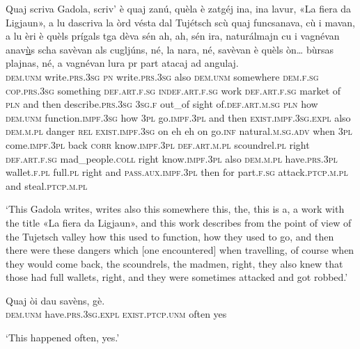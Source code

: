 \begin{linenumbers}
\gll Quaj scriva Gadola, scriv’ è quaj zanú, quèla è zatgéj ina, ina lavur, «La fiera da Ligjaun»\footnotemark, a lu dascriva la òrd vésta dal Tujétsch scù quaj funcsanava, cù i mavan, a lu èri è quèls prígals tga dèva sén ah, ah, sén ira, naturálmajn cu i vagnévan anav\underline{ù}s scha savèvan als cugljúns, né, la nara, né, savèvan è quèls òn… bùrsas plajnas, né, a vagnévan lura pr part atacaj ad angulaj.\\
\textsc{dem.unm} write.\textsc{prs.3sg} \textsc{pn} write.\textsc{prs.3sg} also \textsc{dem.unm} somewhere \textsc{dem.f.sg} \textsc{cop.prs.3sg} something  \textsc{def.art.f.sg} \textsc{indef.art.f.sg} work \textsc{def.art.f.sg} market of \textsc{pln} and then describe.\textsc{prs.3sg} \textsc{3sg.f} out\_of sight of.\textsc{def.art.m.sg} \textsc{pln} how \textsc{dem.unm} function.\textsc{impf.3sg} how \textsc{3pl} go.\textsc{impf.3pl} and then \textsc{exist.impf.3sg.expl} also \textsc{dem.m.pl} danger \textsc{rel} \textsc{exist.impf.3sg} on eh eh on go.\textsc{inf} natural.\textsc{m.sg.adv} when \textsc{3pl} come.\textsc{impf.3pl} back \textsc{corr} know.\textsc{impf.3pl} \textsc{def.art.m.pl} scoundrel.\textsc{pl} right \textsc{def.art.f.sg} mad\_people.\textsc{coll} right know.\textsc{impf.3pl} also \textsc{dem.m.pl} have.\textsc{prs.3pl} wallet.\textsc{f.pl} full.\textsc{pl} right and \textsc{pass.aux.impf.3pl} then for part.\textsc{f.sg} attack.\textsc{ptcp.m.pl} and steal.\textsc{ptcp.m.pl}\\
\end{linenumbers}
\medskip
\glt `This Gadola writes, writes also this somewhere this, the, this is a, a work with the title «La fiera da Ligjaun», and this work describes from the point of view of the Tujetsch valley how this used to function, how they used to go, and then there were these dangers which [one encountered] when travelling, of course when they would come back, the scoundrels, the madmen, right, they also knew that those had full wallets, right, and they were sometimes attacked and got robbed.' 
\medskip

\begin{linenumbers}
\gll Quaj òi dau savèns, gè.\\
  \textsc{dem.unm} have.\textsc{prs.3sg.expl} \textsc{exist.ptcp.unm} often yes\\
\end{linenumbers}
\medskip
\glt `This happened often, yes.'
\medskip


